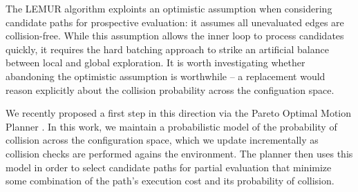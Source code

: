 The LEMUR algorithm exploints an optimistic assumption when considering
candidate paths for prospective evaluation:
it assumes all unevaluated edges are collision-free.
While this assumption allows the inner loop to process candidates
quickly,
it requires the hard batching approach to strike an artificial
balance between local and global exploration.
It is worth investigating whether abandoning the optimistic
assumption is worthwhile --
a replacement would reason explicitly about the collision probability
across the configuation space.

We recently proposed a first step in this direction
via the Pareto Optimal Motion Planner \citep{choudhury2016pomp}.
In this work,
we maintain a probabilistic model of the probability of collision
across the configuration space,
which we update incrementally as collision checks are performed
agains the environment.
The planner then uses this model in order to select candidate paths
for partial evaluation that minimize some combination of the path's
execution cost and its probability of collision.

